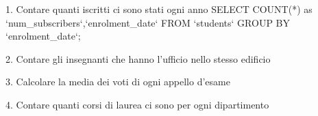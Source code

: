 1. Contare quanti iscritti ci sono stati ogni anno
SELECT COUNT(*) as `num_subscribers`,`enrolment_date` FROM `students` GROUP BY `enrolment_date`;

2. Contare gli insegnanti che hanno l'ufficio nello stesso edificio


3. Calcolare la media dei voti di ogni appello d'esame


4. Contare quanti corsi di laurea ci sono per ogni dipartimento